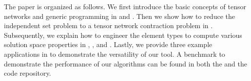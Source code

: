 \documentclass[review, onefignum, onetabnum]{siamart190516}
\begin{document}
The paper is organized as follows.
We first introduce the basic concepts of tensor networks and generic programming in  and .
Then we show how to reduce the independent set problem to a tensor network contraction problem in . 
Subsequently, we explain how to engineer the element types to compute various solution space properties in , , and . %
Lastly, we provide three example applications in  to demonstrate the versatility of our tool.
A benchmark to demonstrate the performance of our algorithms can be found in both the  and the code repository.
\end{document}
